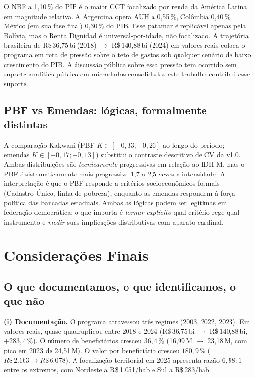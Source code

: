 \documentclass[12pt,a4paper,oneside]{article}
\newcommand{\rs}{R\$\,}
\begin{document}
O NBF a 1,10\,\% do PIB é o maior CCT focalizado por renda da
América Latina em magnitude relativa. A Argentina opera AUH a
0,55\,\%, Colômbia 0,40\,\%, México (em sua fase final) 0,30\,\% do
PIB. Esse patamar é replicável apenas pela Bolívia, mas o Renta
Dignidad é universal-por-idade, não focalizado. A trajetória
brasileira de \rs 36,75\,bi (2018) $\to$ \rs 140,88\,bi (2024) em
valores reais coloca o programa em rota de pressão sobre o teto de
gastos sob qualquer cenário de baixo crescimento do PIB. A
discussão pública sobre essa pressão tem ocorrido sem suporte
analítico público em microdados consolidados \textemdash{} este
trabalho contribui esse suporte.

\subsection{PBF vs Emendas: lógicas, formalmente distintas}

A comparação Kakwani (PBF $K \in [-0,33; -0,26]$ ao longo do
período; emendas $K \in [-0,17; -0,13]$) substitui o contraste
descritivo de CV da v1.0. Ambas distribuições são \textit{tecnicamente}
progressivas em relação ao IDH-M, mas o PBF é
sistematicamente mais progressivo \textemdash{} 1,7 a 2,5 vezes a
intensidade. A interpretação é que o PBF responde a critérios
socioeconômicos formais (Cadastro Único, linha de pobreza),
enquanto as emendas respondem à força política das bancadas
estaduais. Ambas as lógicas podem ser legítimas em federação
democrática; o que importa é \textit{tornar explícito} qual
critério rege qual instrumento e \textit{medir} suas implicações
distributivas com aparato cardinal.


\section{Considerações Finais}\label{sec:conclusao}


\subsection{O que documentamos, o que identificamos, o que não}

\textbf{(i) Documentação.} O programa atravessou três regimes
(2003, 2022, 2023). Em valores
reais, quase quadruplicou entre 2018 e 2024 (\rs 36,75\,bi $\to$
\rs 140,88\,bi, $+283,4\,\%$). O número de beneficiários cresceu
$36,4\,\%$ (16,99\,M $\to$ 23,18\,M, com pico em 2023 de 24,51\,M).
O valor por beneficiário cresceu $180,9\,\%$ ($\rs 2.163 \to
\rs 6.078$). A focalização territorial em 2025 apresenta razão
$6,98:1$ entre os extremos, com Nordeste a \rs 1.051/hab e Sul a
\rs 283/hab.
\end{document}
